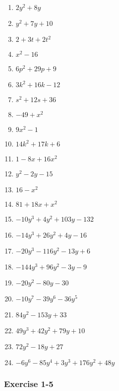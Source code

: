 {\begin{multicols}{3}
\begin{enumerate}[label=\textbf{\arabic*}., noitemsep]
\item $2y^2 + 8y$%
\item $y^2 + 7y + 10$%
\item $2 + 3t +2t^2$%
\item $x^2 - 16$%
\item $6p^2 + 29p + 9$%
\item $3k^2 +16k - 12$%
\item $s^2 + 12s +36$%
\item $-49 + x^2$%
\item $9x^2 - 1$%
\item $14k^2 + 17k + 6$%
\item $1 -8x + 16x^2$%
\item $y^2 - 2y - 15$%
\item $16 - x^2$%
\item $81 + 18x + x^2$%
\item $-10y^3 + 4y^2 + 103y - 132$%
\item $-14y^3 + 26y^2 + 4y -16$ %
\item $-20y^3 -116y^2 -13y +6$%
\item $-144y^3 + 96y^2 -3y -9$%
\item $-20y^2 - 80y - 30$%
\item $-10y^7 - 39y^6 - 36y^5$%
\item $84y^2 - 153y +33$%
\item $49y^3 + 42y^2 + 79y + 10$%
\item $72y^2 - 18y + 27$%
\item $-6y^6 - 85y^4 + 3y^3 + 176y^2 + 48y$%
\end{enumerate}

\subsubsection*{Exercise 1-5} %


\end{multicols}}
